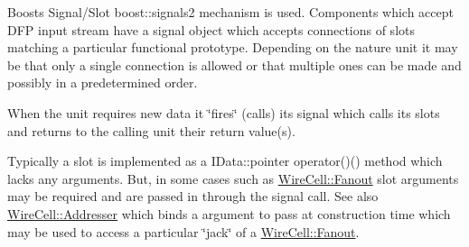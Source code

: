 Boost\textquotesingle{}s Signal/\+Slot {\ttfamily boost\+::signals2} mechanism is used. Components which accept D\+FP input stream have a signal object which accepts connections of slots matching a particular functional prototype. Depending on the nature unit it may be that only a single connection is allowed or that multiple ones can be made and possibly in a predetermined order.

When the unit requires new data it \char`\"{}fires\char`\"{} (calls) its signal which calls its slots and returns to the calling unit their return value(s).

Typically a slot is implemented as a {\ttfamily I\+Data\+::pointer operator()()} method which lacks any arguments. But, in some cases such as {\ttfamily \hyperlink{class_wire_cell_1_1_fanout}{Wire\+Cell\+::\+Fanout}} slot arguments may be required and are passed in through the signal call. See also {\ttfamily \hyperlink{class_wire_cell_1_1_addresser}{Wire\+Cell\+::\+Addresser}} which binds a argument to pass at construction time which may be used to access a particular \char`\"{}jack\char`\"{} of a {\ttfamily \hyperlink{class_wire_cell_1_1_fanout}{Wire\+Cell\+::\+Fanout}}. 